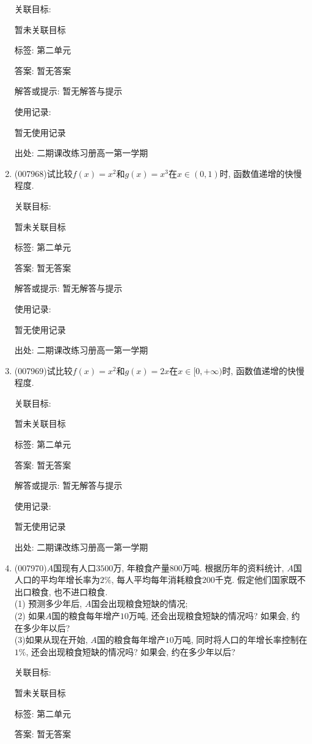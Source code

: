 \documentclass[10pt,a4paper]{article}
\begin{document}
\begin{enumerate}[1.]
关联目标:

暂未关联目标



标签: 第二单元

答案: 暂无答案

解答或提示: 暂无解答与提示

使用记录:

暂无使用记录


出处: 二期课改练习册高一第一学期
\item { (007968)}试比较$f(x)=x^2$和$g(x)=x^3$在$x\in (0,1)$时, 函数值递增的快慢程度.


关联目标:

暂未关联目标



标签: 第二单元

答案: 暂无答案

解答或提示: 暂无解答与提示

使用记录:

暂无使用记录


出处: 二期课改练习册高一第一学期
\item { (007969)}试比较$f(x)=x^2$和$g(x)=2x$在$x\in [0, +\infty)$时, 函数值递增的快慢程度.


关联目标:

暂未关联目标



标签: 第二单元

答案: 暂无答案

解答或提示: 暂无解答与提示

使用记录:

暂无使用记录


出处: 二期课改练习册高一第一学期
\item { (007970)}$A$国现有人口$3500$万, 年粮食产量$800$万吨. 根据历年的资料统计, $A$国人口的平均年增长率为$2\%$, 每人平均每年消耗粮食$200$千克. 假定他们国家既不出口粮食, 也不进口粮食.\\
(1) 预测多少年后, $A$国会出现粮食短缺的情况;\\
(2) 如果$A$国的粮食每年增产$10$万吨, 还会出现粮食短缺的情况吗? 如果会, 约在多少年以后?\\
(3)如果从现在开始, $A$国的粮食每年增产$10$万吨, 同时将人口的年增长率控制在$1\%$, 还会出现粮食短缺的情况吗? 如果会, 约在多少年以后?


关联目标:

暂未关联目标



标签: 第二单元

答案: 暂无答案


\end{enumerate}
\end{document}
